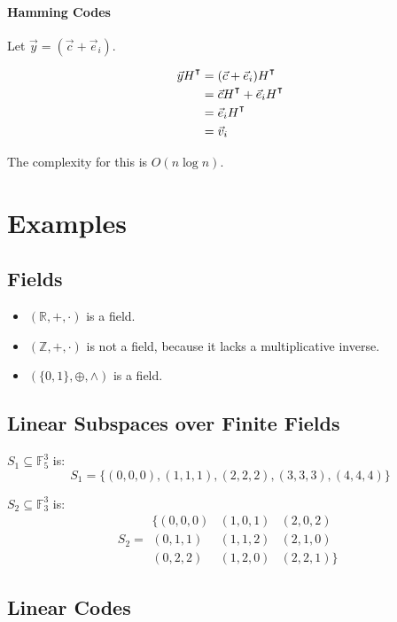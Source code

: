 \documentclass{idc_msc}
\newcommand{\T}{{\mathpalette\raiseT\intercal}}
\newcommand{\raiseT}[2]{\raisebox{0.25ex}{$#1#2$}}
\begin{document}
\paragraph{Hamming Codes}

Let \(\vec{y} = (\vec{c} + \vec{e}_i)\).

\[
\begin{align}
\vec{y}H^\T & = (\vec{c} + \vec{e}_i) H^\T \\
& = \vec{c}H^\T + \vec{e}_i H^\T \\
& = \vec{e}_i H^\T \\
& = \vec{v}_i
\end{align}
\]

The complexity for this is \(O(n \log n)\).

\section{Examples}

\subsection{Fields}

\begin{itemize}
  \item \((\mathbb{R}, +, \cdot)\) is a field.
  \item \((\mathbb{Z}, +, \cdot)\) is not a field, because it lacks a multiplicative inverse.
  \item \((\{0,1\}, \oplus, \land)\) is a field.
\end{itemize}

\subsection{Linear Subspaces over Finite Fields}

\(S_1 \subseteq \mathbb{F}_5^3\) is:
\[S_1 = \{(0,0,0), (1,1,1), (2,2,2), (3,3,3), (4,4,4)\}\]

\(S_2 \subseteq \mathbb{F}_3^3\) is:
\[
  S_2 =
  \begin{matrix}
    \{(0,0,0) & (1,0,1) & (2,0,2) \\
    (0,1,1) & (1,1,2) & (2,1,0) \\
    (0,2,2) & (1,2,0) & (2,2,1)\}
  \end{matrix}
\]

\subsection{Linear Codes}
\end{document}

